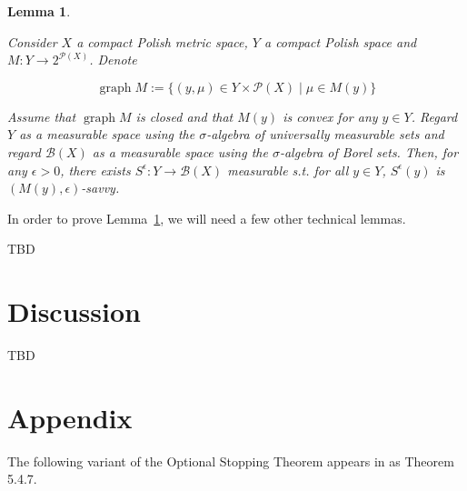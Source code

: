 \documentclass[11pt]{article}
\theoremstyle{definition}
\theoremstyle{plain}
\newtheorem{lemma}{Lemma}%
\DeclareMathOperator{\Gr}{graph}
\newcommand{\PM}{\mathcal{P}}
\newcommand{\Gm}{\mathcal{B}}
\begin{document}
\begin{samepage}
\begin{lemma}
\label{lmm:savvy}

Consider $X$ a compact Polish metric space, $Y$ a compact Polish space and $M: Y \rightarrow 2^{\PM(X)}$. Denote

\begin{equation*}
\Gr{M}:=\{(y, \mu) \in Y \times \PM(X) \mid \mu \in M(y)\}
\end{equation*}

Assume that $\Gr{M}$ is closed and that $M(y)$ is convex for any $y \in Y$. Regard $Y$ as a measurable space using the $\sigma$-algebra of universally measurable sets and regard $\Gm(X)$ as a measurable space using the $\sigma$-algebra of Borel sets. Then, for any $\epsilon > 0$, there exists $S^\epsilon: Y \rightarrow \Gm(X)$ measurable s.t. for all $y \in Y$, $S^\epsilon(y)$ is $(M(y),\epsilon)$-savvy.

\end{lemma}
\end{samepage}

In order to prove Lemma~\ref{lmm:savvy}, we will need a few other technical lemmas.

TBD

\section{Discussion}

TBD

\appendix

\section{Appendix}

The following variant of the Optional Stopping Theorem appears in \cite{Durrett_2010} as Theorem 5.4.7.
\end{document}
